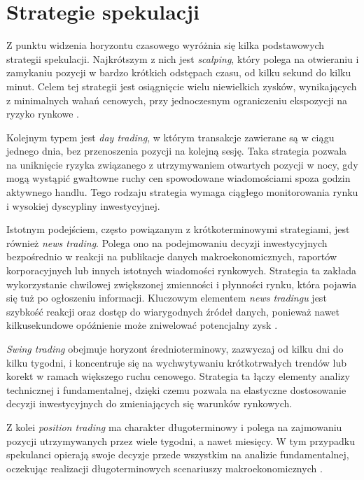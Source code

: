 \section{Strategie spekulacji}

Z punktu widzenia horyzontu czasowego wyróżnia się kilka podstawowych strategii spekulacji. Najkrótszym z nich jest \emph{scalping}, który polega na otwieraniu i zamykaniu pozycji w bardzo krótkich odstępach czasu, od kilku sekund do kilku minut. 
Celem tej strategii jest osiągnięcie wielu niewielkich zysków, wynikających z minimalnych wahań cenowych, przy jednoczesnym ograniczeniu ekspozycji na ryzyko rynkowe \parencite{murphy1999}. 

Kolejnym typem jest \emph{day trading}, w którym transakcje zawierane są w ciągu jednego dnia, bez przenoszenia pozycji na kolejną sesję. 
Taka strategia pozwala na uniknięcie ryzyka związanego z utrzymywaniem otwartych pozycji w nocy, gdy mogą wystąpić gwałtowne ruchy cen spowodowane wiadomościami spoza godzin aktywnego handlu.
Tego rodzaju strategia wymaga ciągłego monitorowania rynku i wysokiej dyscypliny inwestycyjnej.

Istotnym podejściem, często powiązanym z krótkoterminowymi strategiami, jest również \emph{news trading}.
Polega ono na podejmowaniu decyzji inwestycyjnych bezpośrednio w reakcji na publikacje danych makroekonomicznych, raportów korporacyjnych lub innych istotnych wiadomości rynkowych.
Strategia ta zakłada wykorzystanie chwilowej zwiększonej zmienności i płynności rynku, która pojawia się tuż po ogłoszeniu informacji.
Kluczowym elementem \emph{news tradingu} jest szybkość reakcji oraz dostęp do wiarygodnych źródeł danych, ponieważ nawet kilkusekundowe opóźnienie może zniwelować potencjalny zysk \parencite{harris2003}.

\emph{Swing trading} obejmuje horyzont średnioterminowy, zazwyczaj od kilku dni do kilku tygodni, i koncentruje się na wychwytywaniu krótkotrwałych trendów lub korekt w ramach większego ruchu cenowego. 
Strategia ta łączy elementy analizy technicznej i fundamentalnej, dzięki czemu pozwala na elastyczne dostosowanie decyzji inwestycyjnych do zmieniających się warunków rynkowych. 

Z kolei \emph{position trading} ma charakter długoterminowy i polega na zajmowaniu pozycji utrzymywanych przez wiele tygodni, a nawet miesięcy. 
W tym przypadku spekulanci opierają swoje decyzje przede wszystkim na analizie fundamentalnej, oczekując realizacji długoterminowych scenariuszy makroekonomicznych \parencite{hull2018}.

